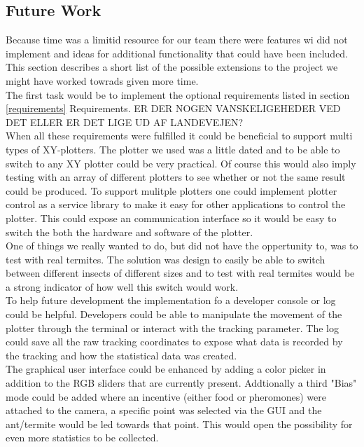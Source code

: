 
\subsection{Future Work}

Because time was a limitid resource for our team there were features wi did not implement and ideas for additional functionality that could have been included. This section describes a short list of the possible extensions to the project we might have worked towrads given more time. \\

The first task would be to implement the optional requirements listed in section \ref{requirements} Requirements. ER DER NOGEN VANSKELIGEHEDER VED DET ELLER ER DET LIGE UD AF LANDEVEJEN? \\

When all these requirements were fulfilled it could be beneficial to support multi types of XY-plotters. The plotter we used was a little dated and to be able to switch to any XY plotter could be very practical. Of course this would also imply testing with an array of different plotters to see whether or not the same result could be produced. To support mulitple plotters one could implement plotter control as a service library to make it easy for other applications to control the plotter. This could expose an communication interface so it would be easy to switch the both the hardware and software of the plotter. \\

One of things we really wanted to do, but did not have the oppertunity to, was to test with real termites. The solution was design to easily be able to switch between different insects of different sizes and to test with real termites would be a strong indicator of how well this switch would work. \\

To help future development the implementation fo a developer console or log could be helpful. Developers could be able to manipulate the movement of the plotter through the terminal or interact with the tracking parameter. The log could save all the raw tracking coordinates to expose what data is recorded by the tracking and how the statistical data was created. \\

The graphical user interface could be enhanced by adding a color picker in addition to the RGB sliders that are currently present. Addtionally a third "Bias" mode could be added where an incentive (either food or pheromones) were attached to the camera, a specific point was selected via the GUI and the ant/termite would be led towards that point. This would open the possibility for even more statistics to be collected.